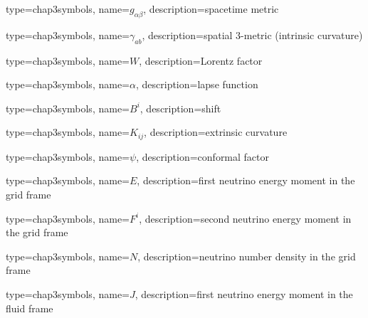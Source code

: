                  {
                   type=chap3symbols,
                   name=$g_{\alpha\beta}$,
                   description={spacetime metric}
                 }


                 {
                   type=chap3symbols,
                   name=$\gamma_{ab}$,
                   description={spatial 3-metric (intrinsic curvature)}
                 }


                 {
                   type=chap3symbols,
                   name=$W$,
                   description={Lorentz factor}
                 }

                 {
                   type=chap3symbols,
                   name=$\alpha$,
                   description={lapse function}
                 }


                 {
                   type=chap3symbols,
                   name=$B^i$,
                   description={shift}
                 }

                 {
                   type=chap3symbols,
                   name=$K_{ij}$,
                   description={extrinsic curvature}
                 }


                 {
                   type=chap3symbols,
                   name=$\psi$,
                   description={conformal factor}
                 }


                 {
                   type=chap3symbols,
                   name=$E$,
                   description={first neutrino energy moment in the grid frame}
                 }

                 {
                   type=chap3symbols,
                   name=$F^i$,
                   description={second neutrino energy moment in the grid frame}
                 }


                 {
                   type=chap3symbols,
                   name=$N$,
                   description={neutrino number density in the grid frame}
                 }


                 {
                   type=chap3symbols,
                   name=$J$,
                   description={first neutrino energy moment in the fluid frame}
                 }

